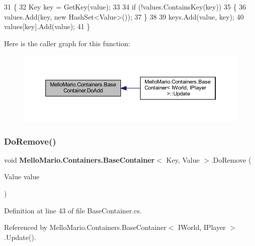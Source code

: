 \begin{DoxyCode}
31         \{
32             Key key = GetKey(value);
33 
34             \textcolor{keywordflow}{if} (!values.ContainsKey(key))
35             \{
36                 values.Add(key, \textcolor{keyword}{new} HashSet<Value>());
37             \}
38 
39             keys.Add(value, key);
40             values[key].Add(value);
41         \}
\end{DoxyCode}
Here is the caller graph for this function\+:
\nopagebreak
\begin{figure}[H]
\begin{center}
\leavevmode
\includegraphics[width=350pt]{classMelloMario_1_1Containers_1_1BaseContainer_abc43a2536f5d915137b83e3181cabce7_icgraph}
\end{center}
\end{figure}
\mbox{\label{classMelloMario_1_1Containers_1_1BaseContainer_a8febada125f487cf10c14b1f65fa6437}} 
\subsubsection{Do\+Remove()}
{\footnotesize\ttfamily void \textbf{ Mello\+Mario.\+Containers.\+Base\+Container}$<$ Key, Value $>$.Do\+Remove (\begin{DoxyParamCaption}\item[{Value}]{value }\end{DoxyParamCaption})\hspace{0.3cm}{\ttfamily [private]}}



Definition at line 43 of file Base\+Container.\+cs.



Referenced by Mello\+Mario.\+Containers.\+Base\+Container$<$ I\+World, I\+Player $>$.\+Update().


